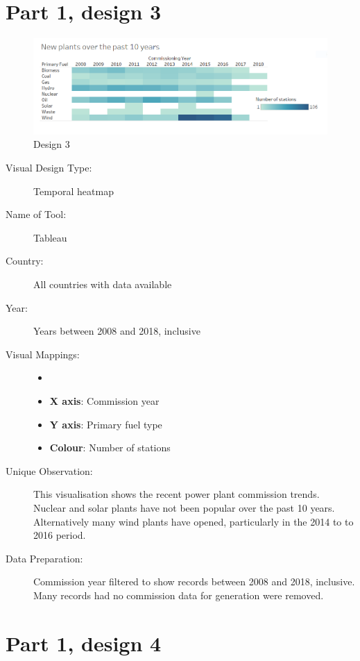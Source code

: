 \documentclass{article}
\begin{document}
\section*{Part 1, design 3}

\begin{figure}[ht]
\centering
\includegraphics[scale=0.6]{NewPlants.PNG}
\caption{Design 3}
\end{figure}

\begin{description}
\item[Visual Design Type:]
Temporal heatmap
\item[Name of Tool:]
Tableau
\item[Country:]
All countries with data available
\item[Year:]
Years between 2008 and 2018, inclusive
\item[Visual Mappings:]
\begin{itemize}
    \item[]
    \item \textbf{X axis}: Commission year
    \item \textbf{Y axis}: Primary fuel type
    \item \textbf{Colour}: Number of stations
\end{itemize} 
\item[Unique Observation:]
This visualisation shows the recent power plant commission trends.
Nuclear and solar plants have not been popular over the past 10 years.
Alternatively many wind plants have opened, particularly in the 2014 to to 2016 period.
\item[Data Preparation:]
 Commission year filtered to show records between 2008 and 2018, inclusive. 
 Many records had no commission data for generation were removed.
\end{description}


\section*{Part 1, design 4}
\end{document}
